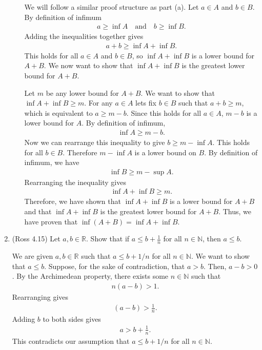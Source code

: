 \documentclass [10pt]{article}
\newcommand{\jg}[1]{{\color{blue} #1}}
\begin{document}
\begin{enumerate}
\begin{enumerate}
\jg{
We will follow a similar proof structure as part (a). Let $a \in A$ and $b \in B$. By definition of infimum 
\begin{align*}
    a \geq \inf A \quad \text{and} \quad b \geq \inf B. 
\end{align*}
Adding the inequalities together gives 
\begin{align*}
    a + b \geq \inf A + \inf B.
\end{align*}
This holds for all $a \in A$ and $b \in B$, so $\inf A + \inf B$ is a lower bound for $A + B$. We now want to show that $\inf A + \inf B$ is the greatest lower bound for $A + B$. 

Let $m$ be any lower bound for $A + B$. We want to show that $\inf A + \inf B \geq m$. For any $a \in A$ lets fix $b \in B$ such that $a + b \geq m$, which is equivalent to $a \geq m - b$. Since this holds for all $a \in A$, $m - b$ is a lower bound for $A$. By definition of infimum, 
\begin{align*}
    \inf A \geq m - b.
\end{align*}
Now we can rearrange this inequality to give $b \geq m - \inf A$. This holds for all $b \in B$. Therefore $m - \inf A$ is a lower bound on $B$. By definition of infimum, we have 
\begin{align*}
    \inf B \geq m - \sup A.
\end{align*}
Rearranging the inequality gives 
\begin{align*}
    \inf A + \inf B \geq m. 
\end{align*}
Therefore, we have shown that $\inf A + \inf B$ is a lower bound for $A + B$ and that $\inf A + \inf B$ is the greatest lower bound for $A + B$. Thus, we have proven that $\inf(A+B) = \inf A + \inf B.$
}
\end{enumerate}
\clearpage
\item (Ross 4.15)
Let $ a, b \in \mathbb{R}.$ Show that if $a \leq b+\frac{1}{n}$ for all $n \in \mathbb{N}$, then $a \leq b.$

\jg{
We are given $a, b \in \mathbb{R}$ such that $a \leq b + 1/n$ for all $n \in \mathbb{N}$. We want to show that $a \leq b$. Suppose, for the sake of contradiction, that $a > b$. Then, $a-b > 0$. By the Archimedean property, there exists some $n \in \mathbb{N}$ such that
\begin{align*}
    n (a-b) > 1.
\end{align*}
Rearranging gives 
\begin{align*}
    (a-b) > \frac{1}{n}.
\end{align*}
Adding $b$ to both sides gives 
\begin{align*}
    a > b + \frac{1}{n}.
\end{align*}
This contradicts our assumption that $a \leq b + 1/n$ for all $n \in \mathbb{N}$. 

}
\end{enumerate}
\end{document}

